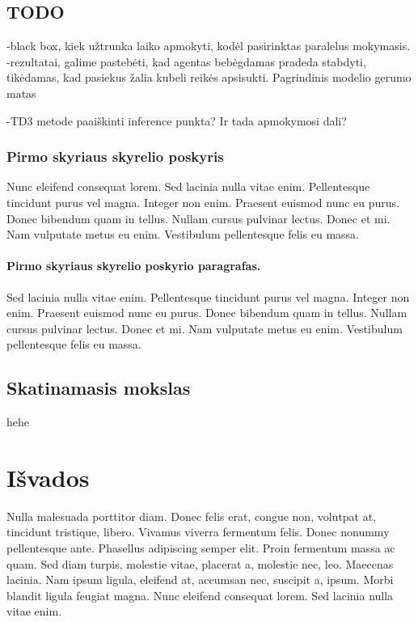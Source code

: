 \documentclass[a4paper, 12pt]{article}
\begin{document}
\subsection{TODO}



-black box, kiek užtrunka laiko apmokyti, kodėl pasirinktas paralelus mokymasis.
-rezultatai, galime pastebėti, kad agentas bebėgdamas pradeda stabdyti, tikėdamas, kad pasiekus žalia kubeli reikės apsisukti. Pagrindinis modelio gerumo matas

-TD3 metode paaiškinti inference punkta? Ir tada apmokymosi dali?

%






\subsubsection{Pirmo skyriaus skyrelio poskyris}
%
Nunc eleifend consequat lorem. Sed lacinia nulla vitae enim. Pellentesque 
tincidunt purus vel magna. Integer non enim. Praesent euismod nunc eu purus. 
Donec bibendum quam in tellus. Nullam cursus pulvinar lectus. Donec et mi. 
Nam vulputate metus eu enim. Vestibulum pellentesque felis eu massa.
%
\paragraph{Pirmo skyriaus skyrelio poskyrio paragrafas.} 
%

Sed lacinia nulla vitae enim. Pellentesque tincidunt purus vel magna. Integer 
non enim. Praesent euismod nunc eu purus. Donec bibendum quam in tellus. 
Nullam cursus pulvinar lectus. Donec et mi. Nam vulputate metus eu enim. 
Vestibulum pellentesque felis eu massa.
%
%
\subsection{Skatinamasis mokslas}
hehe
%
%






\newpage
\section*{Išvados}
{}
%
Nulla malesuada porttitor diam. Donec felis erat, congue non, volutpat at, 
tincidunt tristique, libero. Vivamus viverra fermentum felis. Donec nonummy 
pellentesque ante. Phasellus adipiscing semper elit. Proin fermentum massa ac 
quam. Sed diam turpis, molestie vitae, placerat a, molestie nec, leo. 
Maecenas lacinia. Nam ipsum ligula, eleifend at, accumsan nec, suscipit a, 
ipsum. Morbi blandit ligula feugiat magna. Nunc eleifend consequat lorem. Sed 
lacinia nulla vitae enim. 
\end{document}
